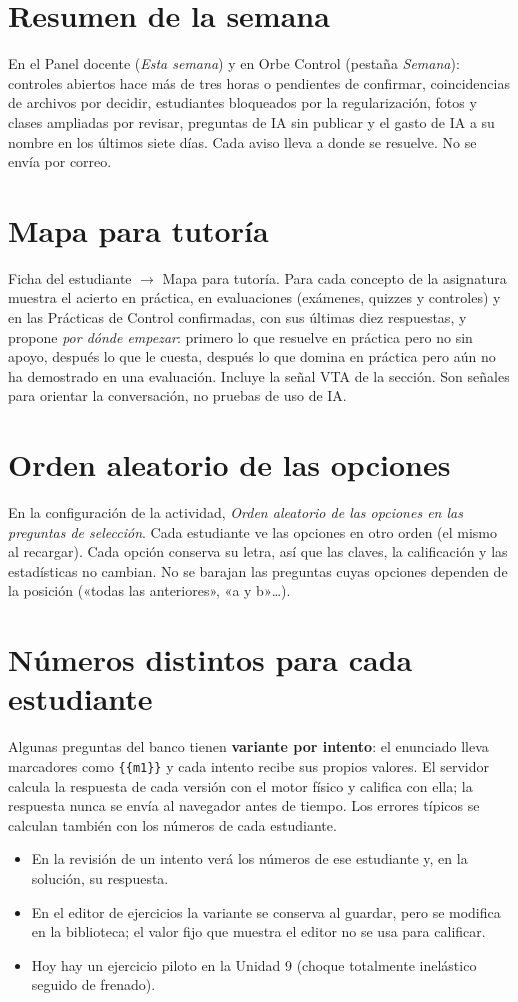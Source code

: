 \documentclass[11pt,a4paper,oneside]{book}
\newcommand{\ruta}[1]{\textsf{#1}}
\begin{document}
\section{Resumen de la semana}
En el Panel docente (\emph{Esta semana}) y en Orbe Control (pestaña \emph{Semana}): controles abiertos hace más de tres horas o
pendientes de confirmar, coincidencias de archivos por decidir, estudiantes bloqueados por la regularización, fotos y clases
ampliadas por revisar, preguntas de IA sin publicar y el gasto de IA a su nombre en los últimos siete días. Cada aviso lleva a donde
se resuelve. No se envía por correo.

\section{Mapa para tutoría}
\ruta{Ficha del estudiante $\rightarrow$ Mapa para tutoría}. Para cada concepto de la asignatura muestra el acierto en práctica, en
evaluaciones (exámenes, quizzes y controles) y en las Prácticas de Control confirmadas, con sus últimas diez respuestas, y propone
\emph{por dónde empezar}: primero lo que resuelve en práctica pero no sin apoyo, después lo que le cuesta, después lo que domina en
práctica pero aún no ha demostrado en una evaluación. Incluye la señal VTA de la sección. Son señales para orientar la conversación,
no pruebas de uso de IA.

\section{Orden aleatorio de las opciones}
En la configuración de la actividad, \emph{Orden aleatorio de las opciones en las preguntas de selección}. Cada
estudiante ve las opciones en otro orden (el mismo al recargar). Cada opción conserva su letra, así que las claves, la
calificación y las estadísticas no cambian. No se barajan las preguntas cuyas opciones dependen de la posición
(«todas las anteriores», «a y b»\ldots).

\section{Números distintos para cada estudiante}
Algunas preguntas del banco tienen \textbf{variante por intento}: el enunciado lleva marcadores como
\texttt{\{\{m1\}\}} y cada intento recibe sus propios valores. El servidor calcula la respuesta de cada versión con el
motor físico y califica con ella; la respuesta nunca se envía al navegador antes de tiempo. Los errores típicos se
calculan también con los números de cada estudiante.
\begin{itemize}
  \item En la revisión de un intento verá los números de ese estudiante y, en la solución, su respuesta.
  \item En el editor de ejercicios la variante se conserva al guardar, pero se modifica en la biblioteca; el valor
        fijo que muestra el editor no se usa para calificar.
  \item Hoy hay un ejercicio piloto en la Unidad 9 (choque totalmente inelástico seguido de frenado).
\end{itemize}
\end{document}
